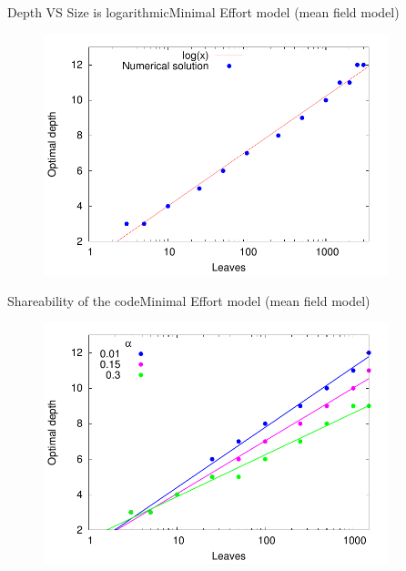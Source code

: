 \documentclass[11pt,svgnames]{beamer}
\begin{document}
\begin{frame}{Depth VS Size is logarithmic}{Minimal Effort model (mean field model)}
\begin{figure}[p]%
\center
\includegraphics[width=10cm,draft=false]{immagini/depVSNnodes_eff.pdf}
\end{figure}
\end{frame}

\begin{frame}{Shareability of the code}{Minimal Effort model (mean field model)}
\begin{figure}[p]%
\center
\includegraphics[width=10cm,draft=false]{immagini/Alpha.pdf}
\end{figure}
\end{frame}
\end{document}
